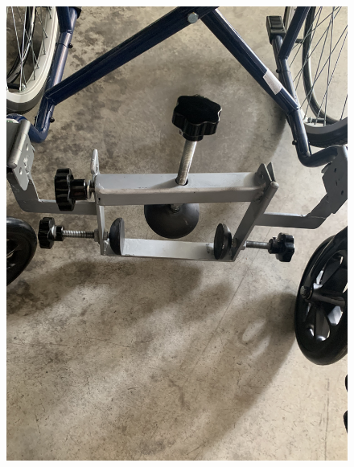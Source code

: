 \documentclass[binding=0.6cm,LaM,noexaminfo]{sapthesis}
\begin{document}
\begin{figure}[!htp]
    \begin{minipage}[t]{.5\textwidth}
    \centering\includegraphics[width=.95\textwidth]{images/finished_project/IMG_3766.jpg}
    \end{minipage}
    \begin{minipage}[t]{.5\textwidth}

\end{minipage}
\end{figure}
\end{document}
